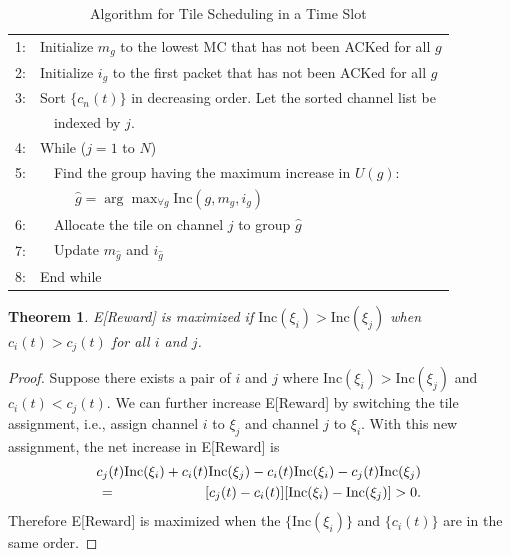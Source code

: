 \documentclass[12pt,onecolumn,draftclsnofoot]{IEEEtran} %
\newtheorem{theorem}{Theorem}
\begin{document}
\begin{table} [!t]
\begin{center}
\caption{Algorithm for Tile Scheduling in a Time Slot}
\begin{tabular}{ll}
\hline
1: & Initialize $m_g$ to the lowest MC that has not been ACKed for all $g$ \\ 
2: & Initialize $i_g$ to the first packet that has not been ACKed for all $g$ \\ 
3: & Sort $\{c_n(t)\}$ in decreasing order. Let the sorted channel list be \\
   & \ \ indexed by $j$. \\ 
4: & While ($j=1$ to $N$) \\
5: & \ \ Find the group having the maximum increase in $U(g)$: \\
   & \ \ \ \ \ $\hat{g}=\arg \max_{\forall g} \mbox{Inc}(g,m_g,i_g)$ \\
6: & \ \ Allocate the tile on channel $j$ to group $\hat{g}$ \\
7: & \ \ Update $m_{\hat{g}}$ and $i_{\hat{g}}$ \\
8: & End while \\
\hline
\end{tabular}
\label{tab:GreedyAlgo3}
\end{center}
\end{table}


\begin{theorem}
  E[Reward] is maximized if $\mbox{Inc}(\xi_i) > \mbox{Inc}(\xi_j)$ when $c_i(t) > c_j(t)$ 
  for all $i$ and $j$.
\end{theorem}
\begin{proof} Suppose there exists a pair of $i$ and $j$ where $\mbox{Inc}(\xi_i) > \mbox{Inc}(\xi_j)$ and $c_i(t) < c_j(t)$. We can further increase E[Reward] by switching the tile assignment, i.e., assign channel $i$ to $\xi_j$ and channel $j$ to $\xi_i$. With this new assignment, the net increase in E[Reward] is 
\begin{eqnarray}
  & & \hspace*{-0.3in} c_j(t)\mbox{Inc}(\xi_i) + c_i(t)\mbox{Inc}(\xi_j)-c_i(t)\mbox{Inc}(\xi_i)-c_j(t)\mbox{Inc}(\xi_j) \nonumber \\
  & = & [c_j(t) - c_i(t)][\mbox{Inc}(\xi_i) - \mbox{Inc}(\xi_j)] > 0. \nonumber
\end{eqnarray}
Therefore E[Reward] is maximized when the $\{ \mbox{Inc}(\xi_i) \}$ and $\{c_i(t)\}$ are in the same order. 
\end{proof}
\end{document}
